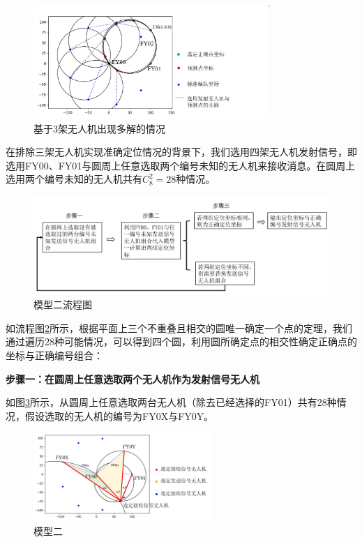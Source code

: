 \documentclass{my_paper}
\begin{document}
\begin{figure}[h]
    \centering
    \includegraphics[width=0.8\textwidth]{images/sandian.jpg}
    \caption{基于3架无人机出现多解的情况}
    \label{sandian}
\end{figure}

在排除三架无人机实现准确定位情况的背景下，我们选用四架无人机发射信号，即选用FY00、FY01与圆周上任意选取两个编号未知的无人机来接收消息。在圆周上选用两个编号未知的无人机共有$C_{8}^{2}=28$种情况。

\begin{figure}[h]
    \centering
    \includegraphics[width=1\textwidth]{images/wenti2liucheng.jpg}
    \caption{模型二流程图}
    \label{moxing2liucheng}
\end{figure}

如流程图\ref{moxing2liucheng}所示，根据平面上三个不重叠且相交的圆唯一确定一个点的定理，我们通过遍历28种可能情况，可以得到四个圆，利用圆所确定点的相交性确定正确点的坐标与正确编号组合：

\textbf{步骤一：在圆周上任意选取两个无人机作为发射信号无人机}

如图\ref{moxing2}所示，从圆周上任意选取两台无人机（除去已经选择的FY01）共有28种情况，假设选取的无人机的编号为FY0X与FY0Y。

\begin{figure}[h]
    \centering
    \includegraphics[width=0.6\textwidth]{images/wenti2.jpg}
    \caption{模型二}
    \label{moxing2}
\end{figure}
\end{document}
